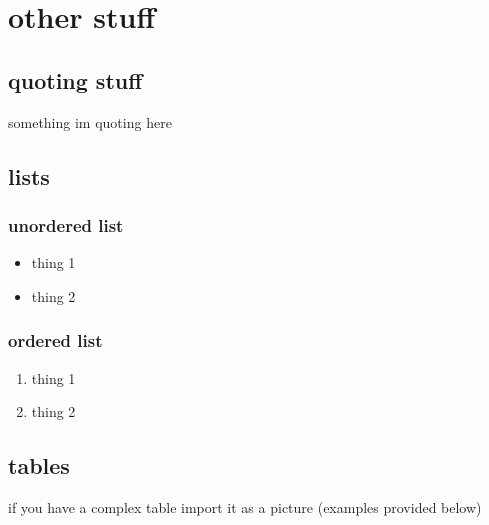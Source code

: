 \documentclass[onecolumn, draftnofoot, 10pt, compsoc]{IEEEtran}
\begin{document}
\section{other stuff}
\subsection{quoting stuff}
something im quoting here\cite{USLI_handbook}

\subsection{lists}

\subsubsection{unordered list}
\begin{itemize}
\item thing 1
\item thing 2
\end{itemize}

\subsubsection{ordered list}
\begin{enumerate}
\item thing 1
\item thing 2
\end{enumerate}

\subsection{tables}
if you have a complex table import it as a picture (examples provided below)



\nocite{*}%


\end{document}

